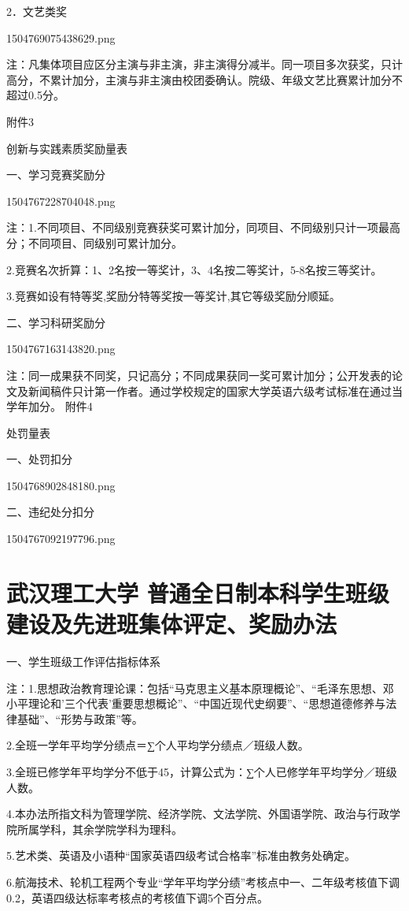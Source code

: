 \documentclass[UTF8,12pt,a4paper]{report}
\begin{document}
2．文艺类奖

1504769075438629.png

注：凡集体项目应区分主演与非主演，非主演得分减半。同一项目多次获奖，只计高分，不累计加分，主演与非主演由校团委确认。院级、年级文艺比赛累计加分不超过0.5分。

 

附件3

创新与实践素质奖励量表



一、学习竞赛奖励分

1504767228704048.png

注：1.不同项目、不同级别竞赛获奖可累计加分，同项目、不同级别只计一项最高分；不同项目、同级别可累计加分。

2.竞赛名次折算：1、2名按一等奖计，3、4名按二等奖计，5-8名按三等奖计。

3.竞赛如设有特等奖,奖励分特等奖按一等奖计,其它等级奖励分顺延。

二、学习科研奖励分

1504767163143820.png

注：同一成果获不同奖，只记高分；不同成果获同一奖可累计加分；公开发表的论文及新闻稿件只计第一作者。通过学校规定的国家大学英语六级考试标准在通过当学年加分。
附件4

  处罚量表



一、处罚扣分

1504768902848180.png

二、违纪处分扣分 

1504767092197796.png
\chapter{武汉理工大学 普通全日制本科学生班级 建设及先进班集体评定、奖励办法}
一、学生班级工作评估指标体系

注：1.思想政治教育理论课：包括“马克思主义基本原理概论”、“毛泽东思想、邓小平理论和'三个代表'重要思想概论”、“中国近现代史纲要”、“思想道德修养与法律基础”、“形势与政策”等。

2.全班一学年平均学分绩点＝∑个人平均学分绩点／班级人数。

3.全班已修学年平均学分不低于45，计算公式为：∑个人已修学年平均学分／班级人数。

4.本办法所指文科为管理学院、经济学院、文法学院、外国语学院、政治与行政学院所属学科，其余学院学科为理科。

5.艺术类、英语及小语种“国家英语四级考试合格率”标准由教务处确定。

6.航海技术、轮机工程两个专业“学年平均学分绩”考核点中一、二年级考核值下调0.2，英语四级达标率考核点的考核值下调5个百分点。
\end{document}
